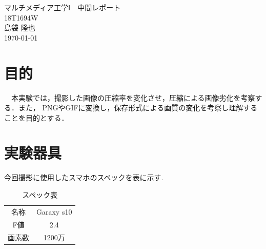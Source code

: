 \documentclass[a4paper,11pt]{bxjsarticle}
\begin{document}
\begin{titlepage}
  \begin{center}
    \vspace*{150truept}
    {\Huge マルチメディア工学Ⅰ　中間レポート}\\ %
    \vspace{120truept}
    {\huge 18T1694W}\\ %
    \vspace{50truept}
    {\huge 島袋 隆也}\\ %
    \vspace{50truept}
    {\huge \today}\\ %
  \end{center}
\end{titlepage}


\section{目的}
　本実験では，撮影した画像の圧縮率を変化させ，圧縮による画像劣化を考察する．また，
PNGやGIFに変換し，保存形式による画質の変化を考察し理解することを目的とする．


\section{実験器具}
  今回撮影に使用したスマホのスペックを表に示す. 
  \begin{table}[htb]
    \begin{center}
      \caption{スペック表}
      \begin{tabular}{|c|c|} \hline
        名称 & Garaxy s10  \\
        F値 & 2.4  \\
        画素数 & 1200万  \\ \hline

      \end{tabular}
      \label{tab:price}
    \end{center}
  \end{table}
\end{document}
